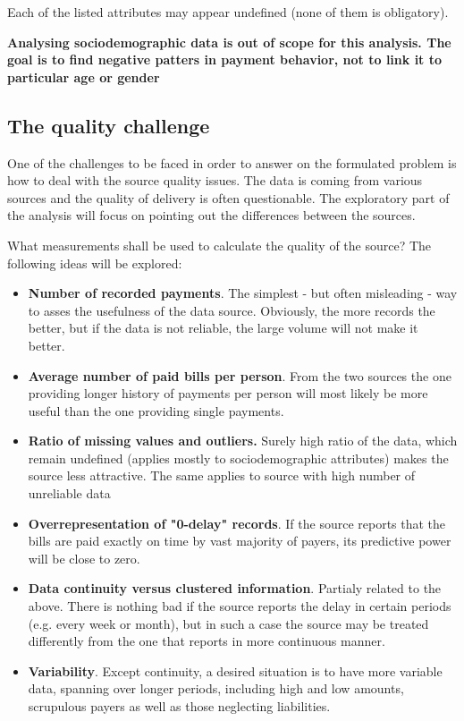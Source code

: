 \documentclass{article}
\begin{document}
Each of the listed attributes may appear undefined (none of them is obligatory).\par 

\textbf{Analysing sociodemographic data is out of scope for this analysis.
The goal is to find negative patters in payment behavior, not to link it to particular age or gender}

\subsection{The quality challenge}
\label{section:intro-quality-challenge}

One of the challenges to be faced in order to answer on the formulated problem is how to deal with the source quality issues.
The data is coming from various sources and the quality of delivery is often questionable.
The exploratory part of the analysis will focus on pointing out the differences between the sources.\par
What measurements shall be used to calculate the quality of the source? The following ideas will be explored:
\begin{itemize}
    \item \textbf{Number of recorded payments}. The simplest - but often misleading - way to asses the usefulness of the data source. Obviously, the more records the better, but if the data is not reliable, the large volume will not make it better.
    \item \textbf{Average number of paid bills per person}. From the two sources the one providing longer history of payments per person will most likely be more useful than the one providing single payments.
    \item \textbf{Ratio of missing values and outliers.} Surely high ratio of the data, which remain undefined (applies mostly to sociodemographic attributes) makes the source less attractive. The same applies to source with high number of unreliable data
    \item \textbf{Overrepresentation of "0-delay" records}. If the source reports that the bills are paid exactly on time by vast majority of payers, its predictive power will be close to zero.
    \item \textbf{Data continuity versus clustered information}. Partialy related to the above. There is nothing bad if the source reports the delay in certain periods (e.g. every week or month), but in such a case the source may be treated differently from the one that reports in more continuous manner.
    \item \textbf{Variability}. Except continuity, a desired situation is to have more variable data, spanning over longer periods, including high and low amounts, scrupulous payers as well as those neglecting liabilities.
\end{itemize}
\end{document}
